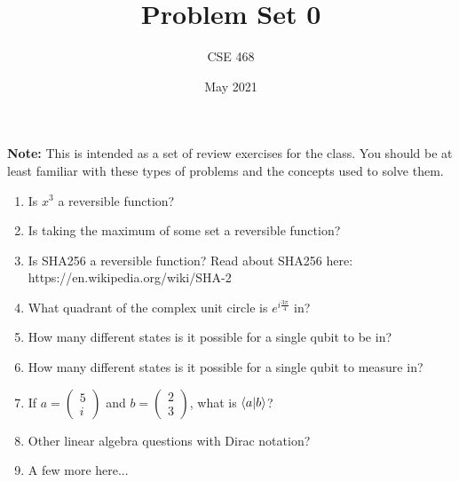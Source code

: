 \documentclass[12pt]{article}
\title{Problem Set 0}
\author{CSE 468}
\date{May 2021}
\begin{document}
\maketitle

\noindent \textbf{Note:} This is intended as a set of review exercises for the class. You should be at least familiar with these types of problems and the concepts used to solve them.

\begin{enumerate}[font=\bfseries]
    \item Is $x^3$ a reversible function?
    \item Is taking the maximum of some set a reversible function?
    \item Is SHA256 a reversible function? Read about SHA256 here: \newline https://en.wikipedia.org/wiki/SHA-2
    \item What quadrant of the complex unit circle is $e^{i\frac{3\pi}{4}}$ in?
    \item How many different states is it possible for a single qubit to be in?
    \item How many different states is it possible for a single qubit to measure in?
    \item If $a = \begin{pmatrix}5 \\ i \end{pmatrix}$ and $b = \begin{pmatrix}2 \\ 3 \end{pmatrix}$, what is $\braket{a|b}$?
    \item Other linear algebra questions with Dirac notation?
    \item A few more here...
    
\end{enumerate}
\end{document}
